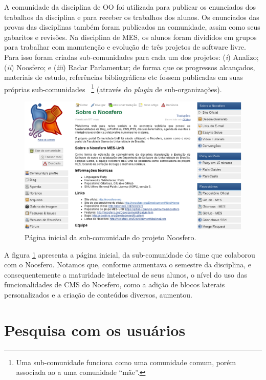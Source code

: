 A comunidade da disciplina de OO foi utilizada para  publicar os enunciados dos
trabalhos da disciplina e para receber os trabalhos dos alunos. Os enunciados
das provas das disciplinas também foram publicados na comunidade, assim como
seus gabaritos e revisões.
%
Na disciplina de MES, os alunos foram divididos em grupos para trabalhar com
manutenção e evolução de três projetos de software livre. Para isso foram
criadas sub-comunidades para cada um dos projetos:
%
(\textit{i}) Analizo;
(\textit{ii}) Noosfero;
e (\textit{iii}) Radar Parlamentar;
%
de forma que os progressos alcançados, materiais de estudo, referências
bibliográficas etc fossem publicadas em suas próprias sub-comunidades%
~\footnote{Uma sub-comunidade funciona como uma comunidade comum, porém
associada ao a uma comunidade ``mãe''.} (através do \textit{plugin} de
sub-organizações).

\begin{figure}[h!]
    \centering
    \includegraphics[keepaspectratio=true,scale=0.35]
      {figuras/Noosfero-MES.eps}
    \caption{Página inicial da sub-comunidade do projeto Noosfero.}
    \label{mes-noosfero}
\end{figure}

A figura \ref{mes-noosfero} apresenta a página inicial,  da sub-comunidade do
time que colaborou com o Noosfero. Notamos que, conforme aumentava o semestre da
disciplina, e consequentemente a maturidade intelectual de seus alunos, o nível
do uso das funcionalidades de CMS do Noosfero, como a adição de blocos
laterais personalizados e a criação de conteúdos diversos, aumentou.

\section{Pesquisa com os usuários}

